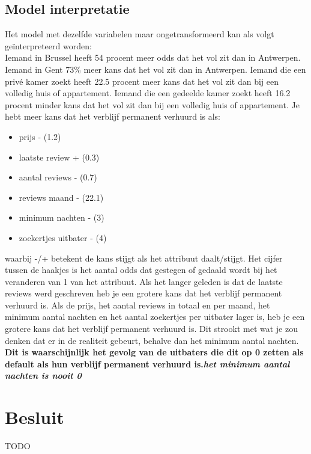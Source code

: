 \documentclass[a4paper,kulak]{kulakarticle} %
\begin{document}
\subsection{Model interpretatie}
Het model met dezelfde variabelen maar ongetransformeerd kan als volgt geïnterpreteerd worden:\\
Iemand in Brussel heeft 54 procent meer odds dat het vol zit dan in Antwerpen. Iemand in Gent   73\% meer kans dat het vol zit dan in Antwerpen.
Iemand die een privé kamer zoekt heeft 22.5 procent meer kans dat het vol zit dan bij een volledig huis of appartement.
Iemand die een gedeelde kamer zoekt   heeft 16.2 procent minder kans dat het vol zit dan bij een  volledig huis of appartement.
Je hebt meer kans dat het verblijf permanent verhuurd is als:
\begin{itemize}
	\item prijs -     (1.2)
	\item laatste review  + (0.3)
	\item aantal reviews - (0.7)
	\item reviews maand - (22.1)
	\item minimum nachten - (3)
	\item zoekertjes uitbater - (4)
\end{itemize}
waarbij -/+ betekent de kans stijgt als het attribuut daalt/stijgt.
Het cijfer tussen de haakjes is het aantal odds dat gestegen of gedaald wordt bij het veranderen van 1 van het attribuut.
Als het langer geleden is dat de laatste reviews werd geschreven heb je een grotere kans dat het verblijf permanent verhuurd is.
Als de prijs, het aantal reviews in totaal en per maand, het minimum aantal nachten en het aantal zoekertjes per uitbater lager is, heb je een grotere kans dat het verblijf permanent verhuurd is.
Dit strookt met wat je zou denken dat er in de realiteit gebeurt, behalve dan het minimum aantal nachten.
\textbf{Dit is waarschijnlijk het gevolg van de uitbaters die dit op 0 zetten als default als hun verblijf permanent verhuurd is.}\textbf{\textit{het minimum aantal nachten is nooit 0}}
\section*{Besluit}

TODO
\end{document}
